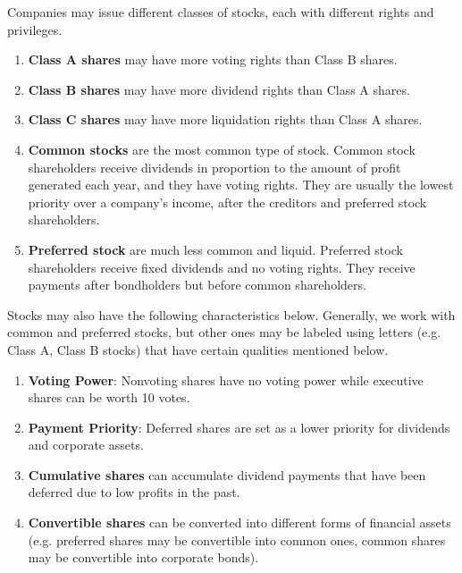 \documentclass{article}
\begin{document}
    \begin{definition}
      \label{def:stock-classes-and-types}
      Companies may issue different classes of stocks, each with different rights and privileges. 
      \begin{enumerate}
        \item \textbf{Class A shares} may have more voting rights than Class B shares. 
        \item \textbf{Class B shares} may have more dividend rights than Class A shares. 
        \item \textbf{Class C shares} may have more liquidation rights than Class A shares. 
        \item \textbf{Common stocks} are the most common type of stock. Common stock shareholders receive dividends in proportion to the amount of profit generated each year, and they have voting rights. They are usually the lowest priority over a company's income, after the creditors and preferred stock shareholders. 
        \item \textbf{Preferred stock} are much less common and liquid. Preferred stock shareholders receive fixed dividends and no voting rights. They receive payments after bondholders but before common shareholders. 
      \end{enumerate}
    \end{definition}
    
    \begin{definition}
      \label{def:properties-and-powers-of-stocks}
      Stocks may also have the following characteristics below. Generally, we work with common and preferred stocks, but other ones may be labeled using letters (e.g. Class A, Class B stocks) that have certain qualities mentioned below. 
      \begin{enumerate}
        \item \textbf{Voting Power}: Nonvoting shares have no voting power while executive shares can be worth 10 votes. 
        \item \textbf{Payment Priority}: Deferred shares are set as a lower priority for dividends and corporate assets. 
        \item \textbf{Cumulative shares} can accumulate dividend payments that have been deferred due to low profits in the past. 
        \item \textbf{Convertible shares} can be converted into different forms of financial assets (e.g. preferred shares may be convertible into common ones, common shares may be convertible into corporate bonds).
      \end{enumerate}
    \end{definition}
\end{document}

